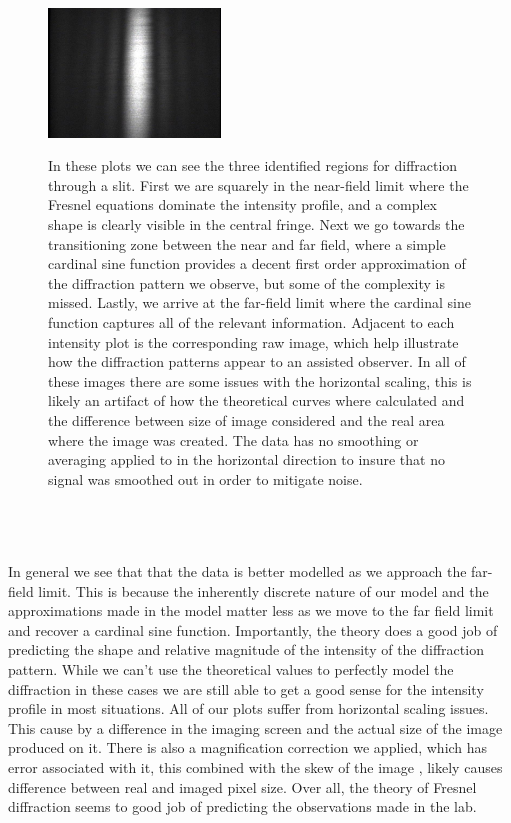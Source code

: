 \documentclass[11pt]{article}
\begin{document}
\begin{center}
\begin{figure}[H]
	\includegraphics[width=1.8in]{"Final Figures/Figure3Raw"}
	\end{figure}
\end{center}

\begin{figure}
	\caption{In these plots we can see the three identified regions for diffraction through a slit. First we are squarely in the near-field limit where the Fresnel equations dominate the intensity profile, and a complex shape is clearly visible in the central fringe. Next we go towards the transitioning zone between the near and far field, where a simple cardinal sine function provides a decent first order approximation of the diffraction pattern we observe, but some of the complexity is missed. Lastly, we arrive at the far-field limit where the cardinal sine function captures all of the relevant information. Adjacent to each intensity plot is the corresponding raw image, which help illustrate how the diffraction patterns appear to an assisted observer. In all of these images there are some issues with the horizontal scaling, this is likely an artifact of how the theoretical curves where calculated and the difference between size of image considered and the real area where the image was created. The data has no smoothing or averaging applied to in the horizontal direction to insure that no signal was smoothed out in order to mitigate noise.}
\end{figure} 
\ \\ \ \\ \ \\

In general we see that that the data is better modelled as we approach the far-field limit. This is because the inherently discrete nature of our model and the approximations made in the model matter less as we move to the far field limit and recover a cardinal sine function. Importantly, the theory does a good job of predicting the shape and relative magnitude of the intensity of the diffraction pattern. While we can’t use the theoretical values to perfectly model the diffraction in these cases we are still able to get a good sense for the intensity profile in most situations. All of our plots suffer from horizontal scaling issues.  This cause by a difference in the imaging screen and the actual size of the image produced on it. There is also a magnification correction we applied, which has error associated with it, this combined with the skew of the image , likely causes difference between real and imaged pixel size. Over all, the theory of Fresnel diffraction seems to good job of predicting the observations made in the lab. 
\end{document}
